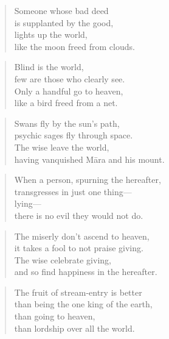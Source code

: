 \documentclass[12pt,openany]{book}%
\begin{document}
\begin{verse}%
Someone whose bad deed \\
is supplanted by the good, \\
lights up the world, \\
like the moon freed from clouds. 

%
\end{verse}

\begin{verse}%
Blind is the world, \\
few are those who clearly see. \\
Only a handful go to heaven, \\
like a bird freed from a net. 

%
\end{verse}

\begin{verse}%
Swans fly by the sun’s path, \\
psychic sages fly through space. \\
The wise leave the world, \\
having vanquished \textsanskrit{Māra} and his mount. 

%
\end{verse}

\begin{verse}%
When a person, spurning the hereafter, \\
transgresses in just one thing—\\
lying—\\
there is no evil they would not do. 

%
\end{verse}

\begin{verse}%
The miserly don’t ascend to heaven, \\
it takes a fool to not praise giving. \\
The wise celebrate giving, \\
and so find happiness in the hereafter. 

%
\end{verse}

\begin{verse}%
The fruit of stream-entry is better \\
than being the one king of the earth, \\
than going to heaven, \\
than lordship over all the world. 

%
\end{verse}
\end{document}
